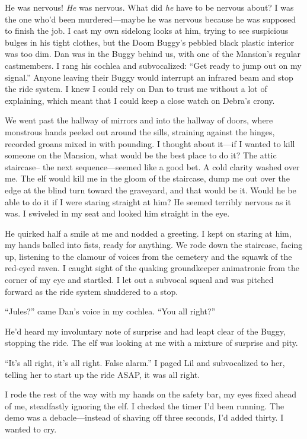 He was nervous! \emph{He} was nervous. What did \emph{he} have to
be nervous about? I was the one who'd been murdered—maybe he was
nervous because he was supposed to finish the job. I cast my own
sidelong looks at him, trying to see suspicious bulges in his tight
clothes, but the Doom Buggy's pebbled black plastic interior was
too dim. Dan was in the Buggy behind us, with one of the Mansion's
regular castmembers. I rang his cochlea and subvocalized: “Get
ready to jump out on my signal.” Anyone leaving their Buggy would
interrupt an infrared beam and stop the ride system. I knew I could
rely on Dan to trust me without a lot of explaining, which meant
that I could keep a close watch on Debra's crony.

We went past the hallway of mirrors and into the hallway of doors,
where monstrous hands peeked out around the sills, straining
against the hinges, recorded groans mixed in with pounding. I
thought about it—if I wanted to kill someone on the Mansion, what
would be the best place to do it? The attic staircase-- the next
sequence—seemed like a good bet. A cold clarity washed over me. The
elf would kill me in the gloom of the staircase, dump me out over
the edge at the blind turn toward the graveyard, and that would be
it. Would he be able to do it if I were staring straight at him? He
seemed terribly nervous as it was. I swiveled in my seat and looked
him straight in the eye.

He quirked half a smile at me and nodded a greeting. I kept on
staring at him, my hands balled into fists, ready for anything. We
rode down the staircase, facing up, listening to the clamour of
voices from the cemetery and the squawk of the red-eyed raven. I
caught sight of the quaking groundkeeper animatronic from the
corner of my eye and startled. I let out a subvocal squeal and was
pitched forward as the ride system shuddered to a stop.

“Jules?” came Dan's voice in my cochlea. “You all right?”

He'd heard my involuntary note of surprise and had leapt clear of
the Buggy, stopping the ride. The elf was looking at me with a
mixture of surprise and pity.

“It's all right, it's all right. False alarm.” I paged Lil and
subvocalized to her, telling her to start up the ride ASAP, it was
all right.

I rode the rest of the way with my hands on the safety bar, my eyes
fixed ahead of me, steadfastly ignoring the elf. I checked the
timer I'd been running. The demo was a debacle—instead of shaving
off three seconds, I'd added thirty. I wanted to cry.

